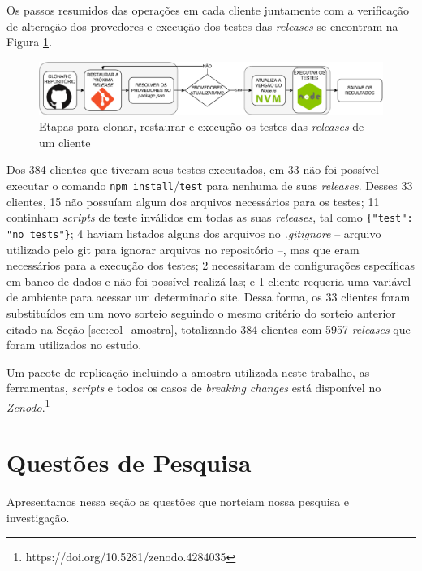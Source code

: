 Os passos resumidos das operações em cada cliente juntamente com a verificação de alteração dos provedores e execução dos testes das \textit{releases} se encontram na Figura \ref{fig:steps_work}.

\begin{figure}
    \centering
    \includegraphics[scale=0.7]{figuras/steps_work.pdf}
    \caption{Etapas para clonar, restaurar e execução os testes das \textit{releases} de um cliente}
    \label{fig:steps_work}
\end{figure}{}

Dos 384 clientes que tiveram seus testes executados, em 33 não foi possível executar o comando \texttt{npm install}/\texttt{test} para nenhuma de suas \textit{releases}. Desses 33 clientes, 15 não possuíam algum dos arquivos necessários para os testes; 11 continham \textit{scripts} de teste inválidos em todas as suas \textit{releases}, tal como \texttt{\{"test": "no tests"\}}; 4 haviam listados alguns dos arquivos no \textit{.gitignore} -- arquivo utilizado pelo \textsf{git} para ignorar arquivos no repositório --, mas que eram necessários para a execução dos testes; 2 necessitaram de configurações específicas em banco de dados e não foi possível realizá-las; e 1 cliente requeria uma variável de ambiente para acessar um determinado site. Dessa forma, os 33 clientes foram substituídos em um novo sorteio seguindo o mesmo critério do sorteio anterior citado na Seção \ref{sec:col_amostra}, totalizando 384 clientes com 5957 \textit{releases} que foram utilizados no estudo.

Um pacote de replicação incluindo a amostra utilizada neste trabalho, as ferramentas, \textit{scripts} e todos os casos de \textit{breaking changes} está disponível no \textit{Zenodo}.\footnote{https://doi.org/10.5281/zenodo.4284035}


\section{Questões de Pesquisa}

Apresentamos nessa seção as questões que norteiam nossa pesquisa e investigação.

